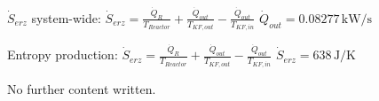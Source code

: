 \( \dot{S}_{erz} \) system-wide:  
\( \dot{S}_{erz} = \frac{\dot{Q}_R}{T_{Reactor}} + \frac{\dot{Q}_{out}}{T_{KF,out}} - \frac{\dot{Q}_{out}}{T_{KF,in}} \)  
\( \dot{Q}_{out} = 0.08277 \, \text{kW/s} \)  

Entropy production:  
\( \dot{S}_{erz} = \frac{\dot{Q}_R}{T_{Reactor}} + \frac{\dot{Q}_{out}}{T_{KF,out}} - \frac{\dot{Q}_{out}}{T_{KF,in}} \)  
\( \dot{S}_{erz} = 638 \, \text{J/K} \)

No further content written.